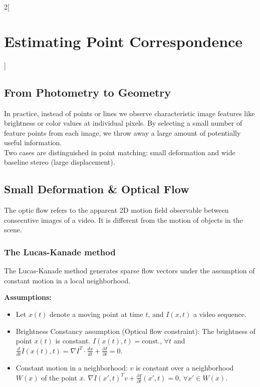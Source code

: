 \documentclass[oneside,fontsize=11pt,paper=a4]{scrartcl}
\begin{document}
\begin{multicols}{2}[\section{Estimating Point Correspondence}]
\subsection{From Photometry to Geometry}
In practice, instead of points or lines we observe characteristic image features like brightness or color values at individual pixels. By selecting a small number of feature points from each image, we throw away a large amount of potentially useful information.\\
Two cases are distinguished in point matching: small deformation and wide baseline stereo (large displacement).

\subsection{Small Deformation \& Optical Flow}
The optic flow refers to the apparent 2D motion field observable between consecutive images of a video.
It is different from the motion of objects in the scene. 

\subsubsection{The Lucas-Kanade method}
The Lucas-Kanade method generates sparse flow vectors under the assumption of constant motion in a local neighborhood.\par
\vspace{5pt}
\textbf{Assumptions:}
\begin{itemize}
	\item Let $x(t)$ denote a moving point at time $t$, and $I(x,t)$ a video sequence.
	\item Brightness Constancy assumption (Optical flow constraint): The brightness of point $x(t)$ is constant. $I(x(t),t) = \text{const.}, \, \forall t$ and $\frac{d}{dt}I(x(t),t) = \nabla I^T \cdot \frac{dx}{dt} + \frac{\partial I}{\partial t} = 0$.
	\item Constant motion in a neighborhood: $v$ is constant over a neighborhood $W(x)$ of the point $x$. $\nabla I(x',t)^T v + \frac{\partial I}{\partial t}(x',t) = 0, \, \forall x' \in W(x)$.
\end{itemize}


\end{multicols}
\end{document}
